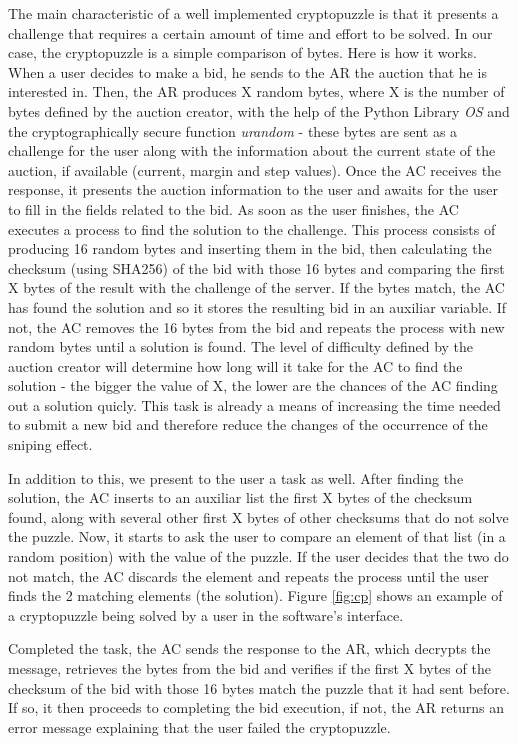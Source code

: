 \documentclass[a4paper]{article}
\begin{document}
The main characteristic of a well implemented cryptopuzzle is that it presents a challenge that requires a certain amount of time and effort to be solved.
In our case, the cryptopuzzle is a simple comparison of bytes. Here is how it works.
When a user decides to make a bid, he sends to the AR the auction that he is interested in.
Then, the AR produces X random bytes, where X is the number of bytes defined by the auction creator, with the help of the Python Library \emph{OS} and the cryptographically secure function \emph{urandom} - these bytes are sent as a challenge for the user along with the information about the current state of the auction, if available (current, margin and step values).
Once the AC receives the response, it presents the auction information to the user and awaits for the user to fill in the fields related to the bid.
As soon as the user finishes, the AC executes a process to find the solution to the challenge. 
This process consists of producing 16 random bytes and inserting them in the bid, then calculating the checksum (using SHA256) of the bid with those 16 bytes and comparing the first X bytes of the result with the challenge of the server.
If the bytes match, the AC has found the solution and so it stores the resulting bid in an auxiliar variable. If not, the AC removes the 16 bytes from the bid and repeats the process with new random bytes until a solution is found.
The level of difficulty defined by the auction creator will determine how long will it take for the AC to find the solution - the bigger the value of X, the lower are the chances of the AC finding out a solution quicly. 
This task is already a means of increasing the time needed to submit a new bid and therefore reduce the changes of the occurrence of the sniping effect.

In addition to this, we present to the user a task as well. 
After finding the solution, the AC inserts to an auxiliar list the first X bytes of the checksum found, along with several other first X bytes of other checksums that do not solve the puzzle.
Now, it starts to ask the user to compare an element of that list (in a random position) with the value of the puzzle.
If the user decides that the two do not match, the AC discards the element and repeats the process until the user finds the 2 matching elements (the solution).
Figure \ref{fig:cp} shows an example of a cryptopuzzle being solved by a user in the software's interface.

Completed the task, the AC sends the response to the AR, which decrypts the message, retrieves the bytes from the bid and verifies if the first X bytes of the checksum of the bid with those 16 bytes match the puzzle that it had sent before.
If so, it then proceeds to completing the bid execution, if not, the AR returns an error message explaining that the user failed the cryptopuzzle.
\end{document}
